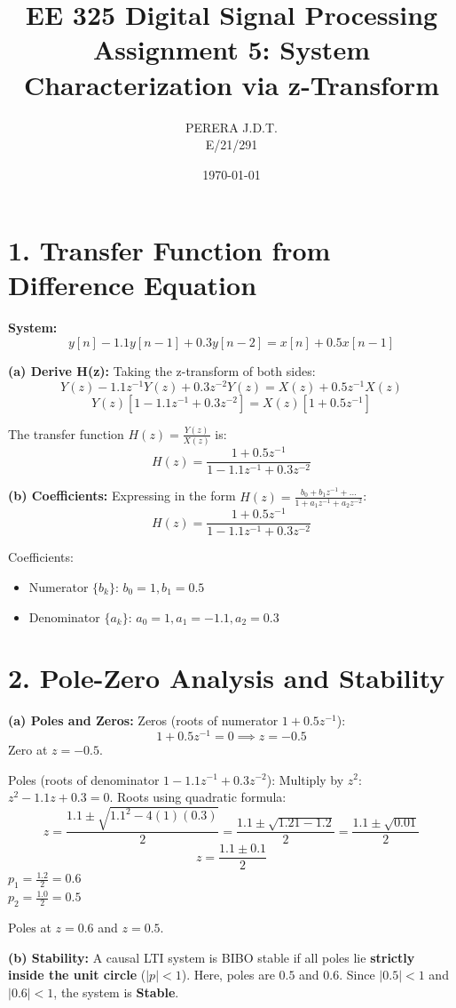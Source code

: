 \documentclass[11pt, a4paper]{article}
\title{EE 325 Digital Signal Processing \\ Assignment 5: System Characterization via z-Transform}
\author{PERERA J.D.T. \\ E/21/291}
\date{\today}
\begin{document}
\maketitle

\section{1. Transfer Function from Difference Equation}
\textbf{System:}
$$y[n] - 1.1y[n-1] + 0.3y[n-2] = x[n] + 0.5x[n-1]$$

\textbf{(a) Derive H(z):}
Taking the z-transform of both sides:
$$Y(z) - 1.1z^{-1}Y(z) + 0.3z^{-2}Y(z) = X(z) + 0.5z^{-1}X(z)$$
$$Y(z) [1 - 1.1z^{-1} + 0.3z^{-2}] = X(z) [1 + 0.5z^{-1}]$$

The transfer function $H(z) = \frac{Y(z)}{X(z)}$ is:
$$H(z) = \frac{1 + 0.5z^{-1}}{1 - 1.1z^{-1} + 0.3z^{-2}}$$

\textbf{(b) Coefficients:}
Expressing in the form $H(z) = \frac{b_0 + b_1 z^{-1} + \dots}{1 + a_1 z^{-1} + a_2 z^{-2}}$:
$$H(z) = \frac{1 + 0.5z^{-1}}{1 - 1.1z^{-1} + 0.3z^{-2}}$$

Coefficients:
\begin{itemize}
    \item Numerator $\{b_k\}$: $b_0 = 1, b_1 = 0.5$
    \item Denominator $\{a_k\}$: $a_0=1, a_1 = -1.1, a_2 = 0.3$
\end{itemize}

\section{2. Pole-Zero Analysis and Stability}

\textbf{(a) Poles and Zeros:}
Zeros (roots of numerator $1 + 0.5z^{-1}$):
$$1 + 0.5z^{-1} = 0 \implies z = -0.5$$
Zero at $z = -0.5$.

Poles (roots of denominator $1 - 1.1z^{-1} + 0.3z^{-2}$):
Multiply by $z^2$: $z^2 - 1.1z + 0.3 = 0$.
Roots using quadratic formula:
$$z = \frac{1.1 \pm \sqrt{1.1^2 - 4(1)(0.3)}}{2} = \frac{1.1 \pm \sqrt{1.21 - 1.2}}{2} = \frac{1.1 \pm \sqrt{0.01}}{2}$$
$$z = \frac{1.1 \pm 0.1}{2}$$
$p_1 = \frac{1.2}{2} = 0.6$\\
$p_2 = \frac{1.0}{2} = 0.5$

Poles at $z = 0.6$ and $z = 0.5$.

\textbf{(b) Stability:}
A causal LTI system is BIBO stable if all poles lie \textbf{strictly inside the unit circle} ($|p| < 1$).
Here, poles are $0.5$ and $0.6$.
Since $|0.5| < 1$ and $|0.6| < 1$, the system is \textbf{Stable}.
\end{document}
